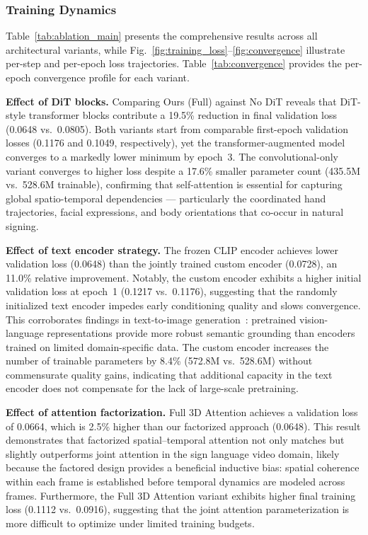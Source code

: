 \documentclass{ieeeaccess}
\begin{document}
\subsubsection{Training Dynamics}

Table~\ref{tab:ablation_main} presents the comprehensive results across all architectural variants, while Fig.~\ref{fig:training_loss}--\ref{fig:convergence} illustrate per-step and per-epoch loss trajectories. Table~\ref{tab:convergence} provides the per-epoch convergence profile for each variant.

\textbf{Effect of DiT blocks.} Comparing Ours (Full) against No DiT reveals that DiT-style transformer blocks contribute a 19.5\% reduction in final validation loss (0.0648 vs.\ 0.0805). Both variants start from comparable first-epoch validation losses (0.1176 and 0.1049, respectively), yet the transformer-augmented model converges to a markedly lower minimum by epoch~3. The convolutional-only variant converges to higher loss despite a 17.6\% smaller parameter count (435.5M vs.\ 528.6M trainable), confirming that self-attention is essential for capturing global spatio-temporal dependencies — particularly the coordinated hand trajectories, facial expressions, and body orientations that co-occur in natural signing.

\textbf{Effect of text encoder strategy.} The frozen CLIP encoder achieves lower validation loss (0.0648) than the jointly trained custom encoder (0.0728), an 11.0\% relative improvement. Notably, the custom encoder exhibits a higher initial validation loss at epoch~1 (0.1217 vs.\ 0.1176), suggesting that the randomly initialized text encoder impedes early conditioning quality and slows convergence. This corroborates findings in text-to-image generation~\cite{rombach2022ldm}: pretrained vision-language representations provide more robust semantic grounding than encoders trained on limited domain-specific data. The custom encoder increases the number of trainable parameters by 8.4\% (572.8M vs.\ 528.6M) without commensurate quality gains, indicating that additional capacity in the text encoder does not compensate for the lack of large-scale pretraining.

\textbf{Effect of attention factorization.} Full 3D Attention achieves a validation loss of 0.0664, which is 2.5\% higher than our factorized approach (0.0648). This result demonstrates that factorized spatial--temporal attention not only matches but slightly outperforms joint attention in the sign language video domain, likely because the factored design provides a beneficial inductive bias: spatial coherence within each frame is established before temporal dynamics are modeled across frames. Furthermore, the Full 3D Attention variant exhibits higher final training loss (0.1112 vs.\ 0.0916), suggesting that the joint attention parameterization is more difficult to optimize under limited training budgets.
\end{document}
